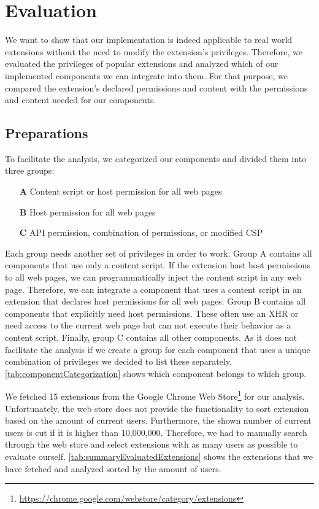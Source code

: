 
\chapter{Evaluation}
\label{chp:extensionAnalysis}
	
	We want to show that our implementation is indeed applicable to real world extensions without the need to modify the extension's privileges. Therefore, we evaluated the privileges of popular extensions and analyzed which of our implemented components we can integrate into them. For that purpose, we compared the extension's declared permissions and content with the permissions and content needed for our components. 
	
\section{Preparations}

	To facilitate the analysis, we categorized our components and divided them into three groups:

	\begin{itemize}[nosep]
		\item[\textbf{A}] Content script or host permission for all web pages
		\item[\textbf{B}] Host permission for all web pages
		\item[\textbf{C}] API permission, combination of permissions, or modified CSP
	\end{itemize}
	
	Each group needs another set of privileges in order to work. Group A contains all components that use only a content script. If the extension hast host permissions to all web pages, we can programmatically inject the content script in any web page. Therefore, we can integrate a component that uses a content script in an extension that declares host permissions for all web pages. Group B contains all components that explicitly need host permissions. These often use an XHR or need access to the current web page but can not execute their behavior as a content script. Finally, group C contains all other components. As it does not facilitate the analysis if we create a group for each component that uses a unique combination of privileges we decided to list these separately. \autoref{tab:componentCategorization} shows which component belongs to which group. 
	
	We fetched 15 extensions from the Google Chrome Web Store\footnote{\url{https://chrome.google.com/webstore/category/extensions}} for our analysis. Unfortunately, the web store does not provide the functionality to sort extension based on the amount of current users. Furthermore, the shown number of current users is cut if it is higher than 10,000,000. Therefore, we had to manually search through the web store and select extensions with as many users as possible to evaluate ourself. \autoref{tab:summaryEvaluatedExtensions} shows the extensions that we have fetched and analyzed sorted by the amount of users. %
	
